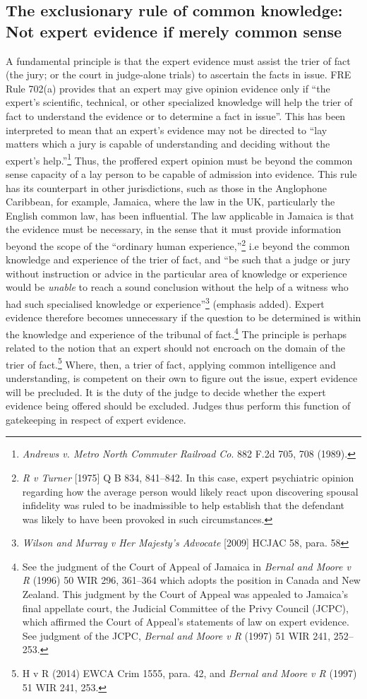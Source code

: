 \documentclass[output=paper,colorlinks,citecolor=brown]{langscibook}
\begin{document}
\subsection{The exclusionary rule of common knowledge: Not expert evidence if merely common sense}
\largerpage[]
A fundamental principle is that the expert evidence must assist the trier of fact (the jury; or the court in judge-alone trials) to ascertain the facts in issue.  FRE Rule 702(a) provides that an expert may give opinion evidence only if “the expert’s scientific, technical, or other specialized knowledge will help the trier of fact to understand the evidence or to determine a fact in issue”.  This has been interpreted to mean that an expert’s evidence may not be directed to “lay matters which a jury is capable of understanding and deciding without the expert's help.”\footnote{\emph{Andrews v. Metro North Commuter Railroad Co}. 882 F.2d 705, 708 (1989).}  Thus, the proffered expert opinion must be beyond the common sense capacity of a lay person to be capable of admission into evidence. This rule has its counterpart in other jurisdictions, such as those in the Anglophone Caribbean, for example, Jamaica, where the law in the UK, particularly the English common law, has been influential. The law applicable in Jamaica is that the evidence must be necessary, in the sense that it must provide information beyond the scope of the “ordinary human experience,”\footnote{\emph{R v Turner} [1975] Q B 834, 841--842. In this case, expert psychiatric opinion regarding how the average person would likely react upon discovering spousal infidelity was ruled to be inadmissible to help establish that the defendant was likely to have been provoked in such circumstances.} i.e beyond the common knowledge and experience of the trier of fact, and “be such that a judge or jury without instruction or advice in the particular area of knowledge or experience would be \textit{unable} to reach a sound conclusion without the help of a witness who had such specialised knowledge or experience”\footnote{\emph{Wilson and Murray v Her Majesty’s Advocate} [2009] HCJAC 58, para. 58} (emphasis added). Expert evidence therefore becomes unnecessary if the question to be determined is within the knowledge and experience of the tribunal of fact.\footnote{See the judgment of the Court of Appeal of Jamaica in \emph{Bernal and Moore v R} (1996) 50 WIR 296, 361--364 which adopts the position in Canada and New Zealand.  This judgment by the Court of Appeal was appealed to Jamaica’s final appellate court, the Judicial Committee of the Privy Council (JCPC), which affirmed the Court of Appeal’s statements of law on expert evidence. See judgment of the JCPC, \emph{Bernal and Moore v R} (1997) 51 WIR 241, 252--253.} The principle is perhaps related to the notion that an expert should not encroach on the domain of the trier of fact.\footnote{H v R (2014) EWCA Crim 1555, para. 42, and \emph{Bernal and Moore v R} (1997) 51 WIR 241, 253.} Where, then, a trier of fact, applying common intelligence and understanding, is competent on their own to figure out the issue, expert evidence will be precluded. It is the duty of the judge to decide whether the expert evidence being offered should be excluded. Judges thus perform this function of gatekeeping in respect of expert evidence.
\end{document}
